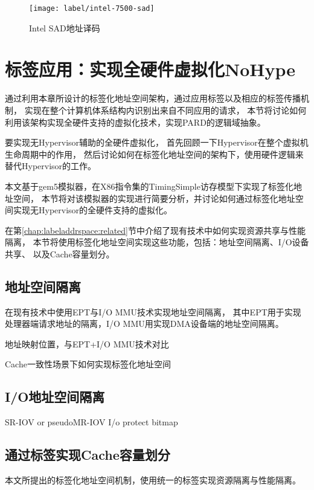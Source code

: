 \begin{figure}[tb]
  \centering
  \texttt{[image: label/intel-7500-sad]}
  \caption[Intel SAD地址译码]{Intel SAD地址译码}
  \label{fig:intel-7500-sad}
\end{figure}


\section{标签应用：实现全硬件虚拟化NoHype}

通过利用本章所设计的标签化地址空间架构，通过应用标签以及相应的标签传播机制，
实现在整个计算机体系结构内识别出来自不同应用的请求，
本节将讨论如何利用该架构实现全硬件支持的虚拟化技术，实现PARD的逻辑域抽象。

要实现无Hypervisor辅助的全硬件虚拟化，
首先回顾一下Hypervisor在整个虚拟机生命周期中的作用，
然后讨论如何在标签化地址空间的架构下，使用硬件逻辑来替代Hypervisor的工作。


本文基于gem5\cite{binkert_gem5_2011}模拟器，在X86指令集的TimingSimple访存模型下实现了标签化地址空间，
本节将对该模拟器的实现进行简要分析，并讨论如何通过标签化地址空间实现无Hypervisor的全硬件支持的虚拟化。

在第\ref{chap:labeladdrspace:related}节中介绍了现有技术中如何实现资源共享与性能隔离，
本节将使用标签化地址空间实现这些功能，包括：地址空间隔离、I/O设备共享、
以及Cache容量划分。

\subsection{地址空间隔离}

在现有技术中使用EPT与I/O MMU技术实现地址空间隔离，
其中EPT用于实现处理器端请求地址的隔离，I/O MMU用实现DMA设备端的地址空间隔离。


地址映射位置，与EPT+I/O MMU技术对比

Cache一致性场景下如何实现标签化地址空间


\subsection{I/O地址空间隔离}

SR-IOV or pseudoMR-IOV
I/o protect bitmap

\subsection{通过标签实现Cache容量划分} %

本文所提出的标签化地址空间机制，使用统一的标签实现资源隔离与性能隔离。


